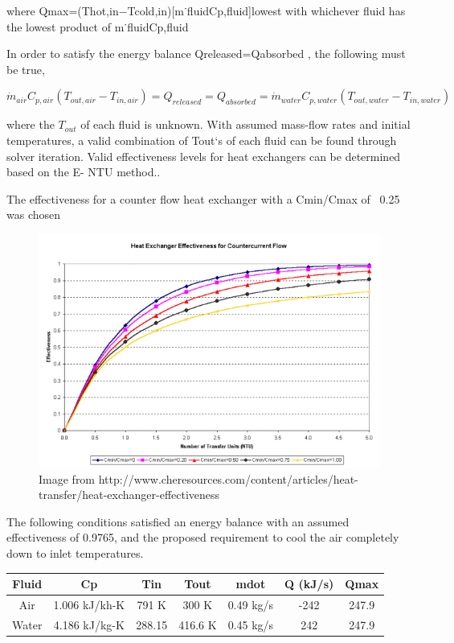 \documentclass[heading.tex]{subfiles}
\begin{document}
where Qmax=(Thot,in−Tcold,in)[m˙fluidCp,fluid]lowest with whichever fluid has the lowest product of m˙fluidCp,fluid

In order to satisfy the energy balance Qreleased=Qabsorbed , the following must be true,

\begin{equation*}
\dot{m}_{air} C_{p, air} (T_{out, air} - T_{in, air}) = {Q}_{released} = {Q}_{absorbed}= \dot{m}_{water} C_{p,water} (T_{out, water} - T_{in, water})
\end{equation*}

where the $T_{out}$  of each fluid is unknown. With assumed mass-flow rates and initial temperatures, a valid combination of Tout‘s of each fluid can be found through solver iteration. Valid effectiveness levels for heat exchangers can be determined based on the E- NTU method..

The effectiveness for a counter flow heat exchanger with a Cmin/Cmax of ~0.25 was chosen 

\begin{figure}[hbtp]
\centering
\includegraphics[scale=0.75]{images/heat_effectiveness.png}
\caption{Image from http://www.cheresources.com/content/articles/heat-transfer/heat-exchanger-effectiveness}
\label{f:heat_effectiveness}
\end{figure}

The following conditions satisfied an energy balance with an assumed effectiveness of 0.9765, and the proposed requirement to cool the air completely down to inlet temperatures.

\begin{tabular}{|c|c|c|c|c|c|c|}
\hline 
Fluid & Cp & Tin & Tout & mdot & Q (kJ/s) & Qmax \\ 
\hline 
Air & 1.006 kJ/kh-K & 791 K & 300 K & 0.49 kg/s & -242 & 247.9 \\ 
\hline 
Water & 4.186 kJ/kg-K & 288.15 & 416.6 K  & 0.45 kg/s & 242 & 247.9 \\ 
\hline 
\end{tabular} 
\end{document}
